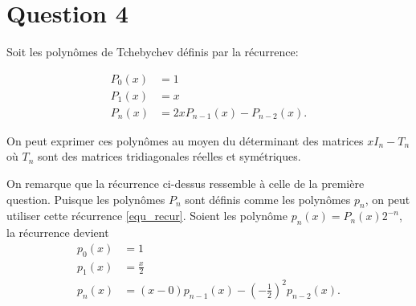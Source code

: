 \section*{Question 4}
Soit les polynômes de Tchebychev définis par la récurrence:

\begin{align*}
  P_0(x) & = 1\\
  P_1(x) & = x\\
  P_n(x) & = 2xP_{n-1}(x) - P_{n-2}(x).
\end{align*}

On peut exprimer ces polynômes au moyen du déterminant des matrices $xI_n - T_n$ où $T_n$ sont des matrices tridiagonales réelles et symétriques.

On remarque que la récurrence ci-dessus ressemble à celle de la première question.
Puisque les polynômes $P_n$ sont définis comme les polynômes $p_n$,
on peut utiliser cette récurrence \eqref{equ_recur}.
Soient les polynôme $p_n(x) = P_n(x)2^{-n}$, la récurrence devient
\begin{align*}
  p_0(x) & = 1\\
  p_1(x) & = \frac{x}{2}\\
  p_n(x) & = (x - 0)p_{n-1}(x) - \left(-\frac{1}{2}\right)^2p_{n-2}(x).
\end{align*}

